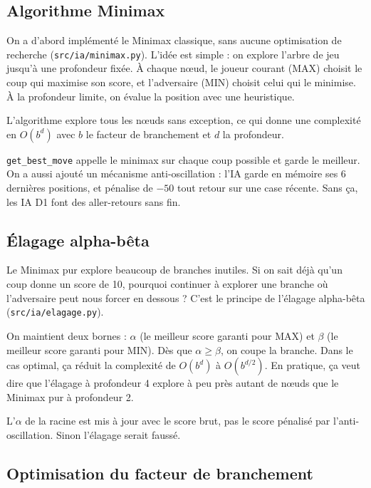 \documentclass[a4paper, 12pt]{report}
\begin{document}
\subsection{Algorithme Minimax}

On a d'abord implémenté le Minimax classique, sans aucune optimisation de recherche (\texttt{src/ia/minimax.py}). L'idée est simple : on explore l'arbre de jeu jusqu'à une profondeur fixée. À chaque n\oe{}ud, le joueur courant (MAX) choisit le coup qui maximise son score, et l'adversaire (MIN) choisit celui qui le minimise. À la profondeur limite, on évalue la position avec une heuristique.

L'algorithme explore tous les n\oe{}uds sans exception, ce qui donne une complexité en $O(b^d)$ avec $b$ le facteur de branchement et $d$ la profondeur. 

\texttt{get\_best\_move} appelle le minimax sur chaque coup possible et garde le meilleur. On a aussi ajouté un mécanisme anti-oscillation : l'IA garde en mémoire ses 6 dernières positions, et pénalise de $-50$ tout retour sur une case récente. Sans ça, les IA D1 font des aller-retours sans fin.

\subsection{Élagage alpha-bêta}

Le Minimax pur explore beaucoup de branches inutiles. Si on sait déjà qu'un coup donne un score de 10, pourquoi continuer à explorer une branche où l'adversaire peut nous forcer en dessous ? C'est le principe de l'élagage alpha-bêta (\texttt{src/ia/elagage.py}).

On maintient deux bornes : $\alpha$ (le meilleur score garanti pour MAX) et $\beta$ (le meilleur score garanti pour MIN). Dès que $\alpha \geq \beta$, on coupe la branche. Dans le cas optimal, ça réduit la complexité de $O(b^d)$ à $O(b^{d/2})$. En pratique, ça veut dire que l'élagage à profondeur 4 explore à peu près autant de n\oe{}uds que le Minimax pur à profondeur 2.

L'$\alpha$ de la racine est mis à jour avec le score brut, pas le score pénalisé par l'anti-oscillation. Sinon l'élagage serait faussé.

\subsection{Optimisation du facteur de branchement}
\end{document}
